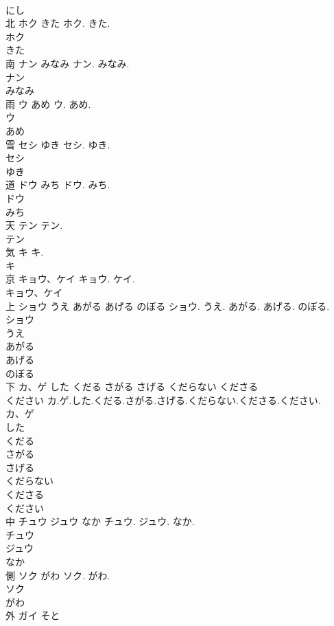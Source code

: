 \documentclass[8pt]{extreport}
\begin{document}
\begin{CJK}{UTF8}{min}
\\	にし
\\	北	ホク きた	ホク. きた.	
\\	ホク
\\	きた
\\	南	ナン みなみ	ナン. みなみ.	
\\	ナン
\\	みなみ
\\	雨	ウ あめ	ウ. あめ.	
\\	ウ
\\	あめ
\\	雪	セシ ゆき	セシ. ゆき.	
\\	セシ
\\	ゆき
\\	道	ドウ みち	ドウ. みち.	
\\	ドウ
\\	みち
\\	天	テン	テン.	
\\	テン
\\	気	キ	キ.	
\\	キ
\\	京	キョウ、ケイ	キョウ. ケイ.	
\\	キョウ、ケイ
\\	上	ショウ うえ あがる あげる のぼる	ショウ. うえ. あがる. あげる. のぼる.	
\\	ショウ
\\	うえ
\\	あがる
\\	あげる
\\	のぼる
\\	下	カ、ゲ した くだる さがる さげる くだらない くださる 
\\	ください	カ.ゲ.した.くだる.さがる.さげる.くだらない.くださる.ください.	
\\	カ、ゲ
\\	した
\\	くだる
\\	さがる
\\	さげる
\\	くだらない
\\	くださる
\\	ください
\\	中	チュウ ジュウ なか	チュウ. ジュウ. なか.	
\\	チュウ
\\	ジュウ
\\	なか
\\	側	ソク がわ	ソク. がわ.	
\\	ソク
\\	がわ
\\	外	ガイ そと 

\end{CJK}
\end{document}
